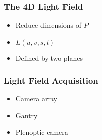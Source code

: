 \documentclass[12pt, compress]{beamer}
\begin{document}
\begin{frame}[fragile]
	\frametitle{The 4D Light Field}
	
	\begin{itemize}[<alert@+>]
		\item Reduce dimensions of $P$
		\item $L(u, v, s, t)$
		\item Defined by two planes
	\end{itemize}
	\begin{center}
	\end{center}
\end{frame}

\begin{frame}[fragile]
	\frametitle{Light Field Acquisition}
	
	\begin{itemize}[<alert@+>]
		\item Camera array
		\item Gantry
		\item Plenoptic camera
	\end{itemize}
	
	\begin{center}
		\hspace{0.2cm}
		\hspace{0.2cm}
	\end{center}
	
\end{frame}
\end{document}
